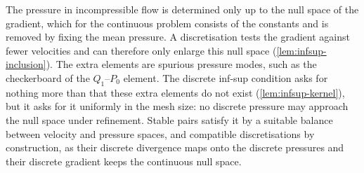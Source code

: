 The pressure in incompressible flow is determined only up to the null space of the gradient, which for the continuous problem consists of the constants and is removed by fixing the mean pressure. A discretisation tests the gradient against fewer velocities and can therefore only enlarge this null space (\cref{lem:infsup-inclusion}). The extra elements are spurious pressure modes, such as the checkerboard of the $Q_1$--$P_0$ element. The discrete inf-sup condition asks for nothing more than that these extra elements do not exist (\cref{lem:infsup-kernel}), but it asks for it uniformly in the mesh size: no discrete pressure may approach the null space under refinement. Stable pairs satisfy it by a suitable balance between velocity and pressure spaces, and compatible discretisations by construction, as their discrete divergence maps onto the discrete pressures and their discrete gradient keeps the continuous null space.
